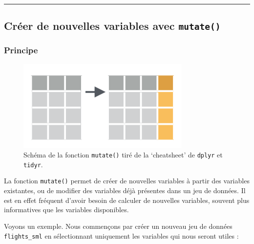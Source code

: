 \documentclass[
  a4paper,
]{article}
\newenvironment{Shaded}{\begin{snugshade}}{\end{snugshade}}
\newcommand{\KeywordTok}[1]{\textcolor[rgb]{0.12,0.11,0.11}{\textbf{#1}}}
\newcommand{\NormalTok}[1]{\textcolor[rgb]{0.12,0.11,0.11}{#1}}
\newcommand{\OperatorTok}[1]{\textcolor[rgb]{0.12,0.11,0.11}{#1}}
\newcommand{\StringTok}[1]{\textcolor[rgb]{0.75,0.01,0.01}{#1}}
\begin{document}
\begin{center}\rule{0.5\linewidth}{0.5pt}\end{center}

\hypertarget{mutate}{%
\subsection{\texorpdfstring{Créer de nouvelles variables avec \texttt{mutate()}}{Créer de nouvelles variables avec mutate()}}\label{mutate}}

\hypertarget{principe-1}{%
\subsubsection{Principe}\label{principe-1}}

\begin{figure}[htpb]

{\centering \includegraphics[width=0.5\linewidth]{images/mutate} 

}

\caption{Schéma de la fonction \texttt{mutate()} tiré de la `cheatsheet' de \texttt{dplyr} et \texttt{tidyr}.}\label{fig:mutatefig}
\end{figure}



La fonction \texttt{mutate()} permet de créer de nouvelles variables à partir des variables existantes, ou de modifier des variables déjà présentes dans un jeu de données. Il est en effet fréquent d'avoir besoin de calculer de nouvelles variables, souvent plus informatives que les variables disponibles.

Voyons un exemple. Nous commençons par créer un nouveau jeu de données \texttt{flights\_sml} en sélectionnant uniquement les variables qui nous seront utiles :

\begin{Shaded}
\end{Shaded}
\end{document}

